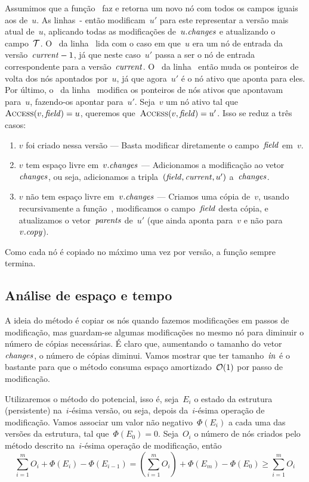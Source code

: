 \documentclass[../../main.tex]{subfiles}
\begin{document}
Assumimos que a função~ faz e retorna um novo nó com todos os campos iguais aos de~$u$. As linhas~- então modificam~$u'$ para este representar a versão mais atual de~$u$, aplicando todas as modificações de~$u.\mathit{changes}$ e atualizando o campo~$\mathcal{T}$. O~ da linha~ lida com o caso em que~$u$ era um nó de entrada da versão~$\mathit{current}-1$, já que neste caso~$u'$ passa a ser o nó de entrada correspondente para a versão~$\mathit{current}$. O~ da linha~ então muda os ponteiros de volta dos nós apontados por~$u$, já que agora~$u'$ é o nó ativo que aponta para eles. Por último, o~ da linha~ modifica os ponteiros de nós ativos que apontavam para~$u$, fazendo-os apontar para~$u'$. Seja~$v$ um nó ativo tal que~$\Call{Access}{v, \V{field}} = u$, queremos que~$\Call{Access}{v, \V{field}} = u'$. Isso se reduz a três casos:
\begin{enumerate}
\item $v$ foi criado nessa versão --- Basta modificar diretamente o campo~$\mathit{field}$ em~$v$.
\item $v$ tem espaço livre em~$v.\mathit{changes}$ --- Adicionamos a modificação ao vetor~$\mathit{changes}$, ou seja, adicionamos a tripla~$(\mathit{field}, \mathit{current}, u')$ a~$\mathit{changes}$.
\item $v$ não tem espaço livre em~$v.\mathit{changes}$ --- Criamos uma cópia de~$v$, usando recursivamente a função~\textsc{}, modificamos o campo~$\mathit{field}$ desta cópia, e atualizamos o vetor~$\mathit{parents}$ de~$u'$ (que ainda aponta para~$v$ e não para~$v.\mathit{copy}$).
\end{enumerate}

Como cada nó é copiado no máximo uma vez por versão, a função sempre termina.

\subsection{Análise de espaço e tempo}

A ideia do método é copiar os nós quando fazemos modificações em passos de modificação, mas guardam-se algumas modificações no mesmo nó para diminuir o número de cópias necessárias. É claro que, aumentando o tamanho do vetor~$\mathit{changes}$, o número de cópias diminui. Vamos mostrar que ter tamanho~$\mathit{in}$ é o bastante para que o método consuma espaço amortizado~$\mathcal{O}(1)$ por passo de modificação.

Utilizaremos o método do potencial, isso é, seja~$E_i$ o estado da estrutura (persistente) na~$i$-ésima versão, ou seja, depois da~$i$-ésima operação de modificação. Vamos associar um valor não negativo~$\Phi(E_i)$ a cada uma das versões da estrutura, tal que~$\Phi(E_0) = 0$. Seja~$O_i$ o número de nós criados pelo método descrito na~$i$-ésima operação de modificação, então
$$ \sum\limits_{i=1}^{m}{O_i + \Phi(E_i) - \Phi(E_{i-1})} = \left(\sum\limits_{i=1}^m{O_i}\right) + \Phi(E_m) - \Phi(E_0) \geq \sum\limits_{i=1}^m{O_i} $$
\end{document}
